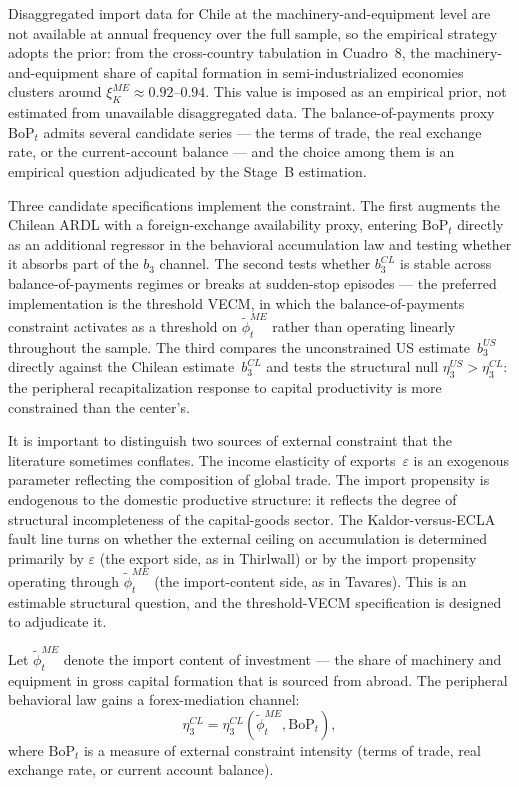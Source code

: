 \documentclass[12pt,letterpaper]{article}
\begin{document}
Disaggregated import data for Chile at the machinery-and-equipment level are
not available at annual frequency over the full sample, so the empirical
strategy adopts the \citet{kaldor1959} prior: from the cross-country
tabulation in Cuadro~8, the machinery-and-equipment share of capital formation
in semi-industrialized economies clusters around
$\xi_K^{ME} \approx 0.92$--$0.94$. This value is imposed as an empirical
prior, not estimated from unavailable disaggregated data. The balance-of-payments
proxy~$\text{BoP}_t$ admits several candidate series --- the terms of trade,
the real exchange rate, or the current-account balance --- and the choice among
them is an empirical question adjudicated by the Stage~B estimation.

Three candidate specifications implement the constraint. The first augments
the Chilean ARDL with a foreign-exchange availability proxy, entering
$\text{BoP}_t$ directly as an additional regressor in the behavioral
accumulation law and testing whether it absorbs part of the $b_3$ channel. The
second tests whether $b_3^{CL}$ is stable across balance-of-payments regimes
or breaks at sudden-stop episodes --- the preferred implementation is the
\citet{hansenseo2002} threshold VECM, in which the balance-of-payments
constraint activates as a threshold on $\tilde{\phi}^{ME}_t$ rather than
operating linearly throughout the sample. The third compares the unconstrained
US estimate~$b_3^{US}$ directly against the Chilean estimate~$b_3^{CL}$ and
tests the structural null $\eta_3^{US} > \eta_3^{CL}$: the peripheral
recapitalization response to capital productivity is more constrained than the
center's.

It is important to distinguish two sources of external constraint that the
literature sometimes conflates. The income elasticity of exports~$\varepsilon$
is an exogenous parameter reflecting the composition of global trade. The
import propensity is endogenous to the domestic productive structure: it
reflects the degree of structural incompleteness of the capital-goods sector.
The Kaldor-versus-ECLA fault line turns on whether the external ceiling on
accumulation is determined primarily by $\varepsilon$ (the export side, as in
Thirlwall) or by the import propensity operating through
$\tilde{\phi}^{ME}_t$ (the import-content side, as in Tavares). This is an
estimable structural question, and the threshold-VECM specification is designed
to adjudicate it.

Let $\tilde{\phi}^{ME}_t$ denote the import content of investment —
the share of machinery and equipment in gross capital formation that is
sourced from abroad. The peripheral behavioral law gains a
forex-mediation channel:
\begin{equation}
  \eta^{CL}_3 = \eta^{CL}_3\!\left(\tilde{\phi}^{ME}_t, \text{BoP}_t\right),
  \label{eq:tavares_constraint}
\end{equation}
where $\text{BoP}_t$ is a measure of external constraint intensity
(terms of trade, real exchange rate, or current account balance).
\end{document}
